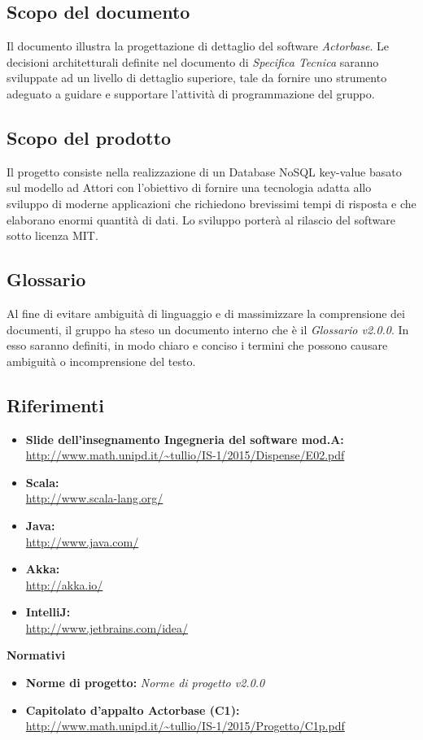 \documentclass[a4paper]{article}
\begin{document}
	\subsection{Scopo del documento}
		Il documento illustra la progettazione di dettaglio del software \emph{Actorbase}.
		Le decisioni architetturali definite nel documento di \emph{Specifica Tecnica} saranno sviluppate ad un livello di dettaglio superiore, tale da fornire uno strumento adeguato a guidare e supportare l'attività di programmazione del gruppo.
	\subsection{Scopo del prodotto}
		Il progetto consiste nella realizzazione di un Database NoSQL key-value basato sul modello ad 
		Attori con l'obiettivo di fornire una tecnologia adatta allo sviluppo di moderne 
		applicazioni che richiedono brevissimi tempi di risposta e che elaborano enormi quantità 
		di dati. Lo sviluppo porterà al rilascio del software sotto licenza MIT.
	\subsection{Glossario}
		Al fine di evitare ambiguità di linguaggio e di massimizzare la comprensione dei documenti, il 
      gruppo ha steso un documento interno che è il \emph{Glossario v2.0.0}. In esso saranno definiti, in modo
      chiaro e conciso i termini che possono causare ambiguità o incomprensione del testo.
	\subsection{Riferimenti}
		\begin{itemize}
			\item \textbf{Slide dell'insegnamento Ingegneria del software mod.A:} \\
			\url{http://www.math.unipd.it/~tullio/IS-1/2015/Dispense/E02.pdf}
			\item \textbf{Scala:} \\
			\url{http://www.scala-lang.org/}
			\item \textbf{Java:} \\
			\url{http://www.java.com/}
			\item \textbf{Akka:} \\
			\url{http://akka.io/}
			\item \textbf{IntelliJ:} \\
			\url{http://www.jetbrains.com/idea/}
		\end{itemize}
	\textbf{Normativi}
		\begin{itemize}
			\item \textbf{Norme di progetto:} \emph{Norme di progetto v2.0.0}
			\item \textbf{Capitolato d'appalto Actorbase (C1):} \\ 
			\url{http://www.math.unipd.it/~tullio/IS-1/2015/Progetto/C1p.pdf}
		\end{itemize}
		
\end{document}
